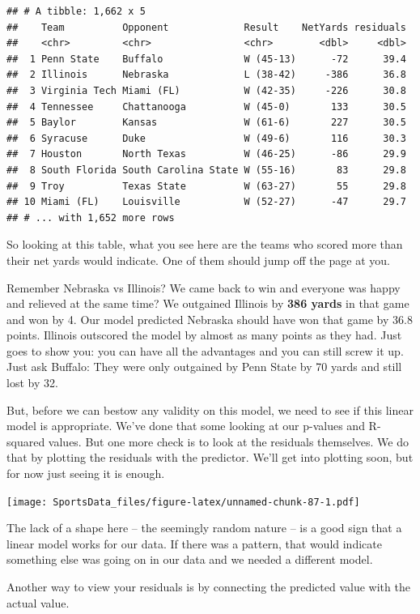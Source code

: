 \documentclass[
]{book}
\begin{document}
\begin{verbatim}
## # A tibble: 1,662 x 5
##    Team          Opponent             Result    NetYards residuals
##    <chr>         <chr>                <chr>        <dbl>     <dbl>
##  1 Penn State    Buffalo              W (45-13)      -72      39.4
##  2 Illinois      Nebraska             L (38-42)     -386      36.8
##  3 Virginia Tech Miami (FL)           W (42-35)     -226      30.8
##  4 Tennessee     Chattanooga          W (45-0)       133      30.5
##  5 Baylor        Kansas               W (61-6)       227      30.5
##  6 Syracuse      Duke                 W (49-6)       116      30.3
##  7 Houston       North Texas          W (46-25)      -86      29.9
##  8 South Florida South Carolina State W (55-16)       83      29.8
##  9 Troy          Texas State          W (63-27)       55      29.8
## 10 Miami (FL)    Louisville           W (52-27)      -47      29.7
## # ... with 1,652 more rows
\end{verbatim}

So looking at this table, what you see here are the teams who scored more than their net yards would indicate. One of them should jump off the page at you.

Remember Nebraska vs Illinois? We came back to win and everyone was happy and relieved at the same time? We outgained Illinois by \textbf{386 yards} in that game and won by 4. Our model predicted Nebraska should have won that game by 36.8 points. Illinois outscored the model by almost as many points as they had. Just goes to show you: you can have all the advantages and you can still screw it up. Just ask Buffalo: They were only outgained by Penn State by 70 yards and still lost by 32.

But, before we can bestow any validity on this model, we need to see if this linear model is appropriate. We've done that some looking at our p-values and R-squared values. But one more check is to look at the residuals themselves. We do that by plotting the residuals with the predictor. We'll get into plotting soon, but for now just seeing it is enough.

\texttt{[image: SportsData\_files/figure-latex/unnamed-chunk-87-1.pdf]}

The lack of a shape here -- the seemingly random nature -- is a good sign that a linear model works for our data. If there was a pattern, that would indicate something else was going on in our data and we needed a different model.

Another way to view your residuals is by connecting the predicted value with the actual value.
\end{document}
